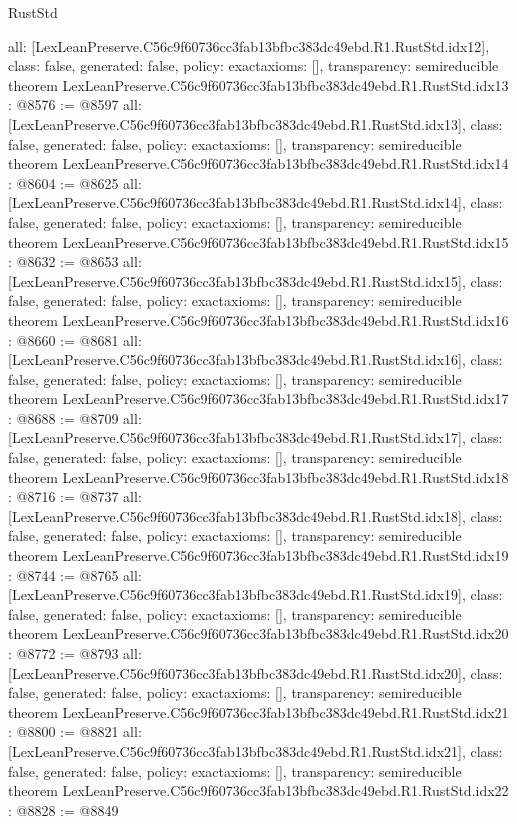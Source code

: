 \begin{lexlean}{RustStd}
\begin{coremodule}
{  all: [LexLeanPreserve.C56c9f60736cc3fab13bfbc383dc49ebd.R1.RustStd.idx12],
  class: false,
  generated: false,
  policy: exact{axioms: []},
  transparency: semireducible
}
theorem LexLeanPreserve.C56c9f60736cc3fab13bfbc383dc49ebd.R1.RustStd.idx13 : @8576 := @8597 {
  all: [LexLeanPreserve.C56c9f60736cc3fab13bfbc383dc49ebd.R1.RustStd.idx13],
  class: false,
  generated: false,
  policy: exact{axioms: []},
  transparency: semireducible
}
theorem LexLeanPreserve.C56c9f60736cc3fab13bfbc383dc49ebd.R1.RustStd.idx14 : @8604 := @8625 {
  all: [LexLeanPreserve.C56c9f60736cc3fab13bfbc383dc49ebd.R1.RustStd.idx14],
  class: false,
  generated: false,
  policy: exact{axioms: []},
  transparency: semireducible
}
theorem LexLeanPreserve.C56c9f60736cc3fab13bfbc383dc49ebd.R1.RustStd.idx15 : @8632 := @8653 {
  all: [LexLeanPreserve.C56c9f60736cc3fab13bfbc383dc49ebd.R1.RustStd.idx15],
  class: false,
  generated: false,
  policy: exact{axioms: []},
  transparency: semireducible
}
theorem LexLeanPreserve.C56c9f60736cc3fab13bfbc383dc49ebd.R1.RustStd.idx16 : @8660 := @8681 {
  all: [LexLeanPreserve.C56c9f60736cc3fab13bfbc383dc49ebd.R1.RustStd.idx16],
  class: false,
  generated: false,
  policy: exact{axioms: []},
  transparency: semireducible
}
theorem LexLeanPreserve.C56c9f60736cc3fab13bfbc383dc49ebd.R1.RustStd.idx17 : @8688 := @8709 {
  all: [LexLeanPreserve.C56c9f60736cc3fab13bfbc383dc49ebd.R1.RustStd.idx17],
  class: false,
  generated: false,
  policy: exact{axioms: []},
  transparency: semireducible
}
theorem LexLeanPreserve.C56c9f60736cc3fab13bfbc383dc49ebd.R1.RustStd.idx18 : @8716 := @8737 {
  all: [LexLeanPreserve.C56c9f60736cc3fab13bfbc383dc49ebd.R1.RustStd.idx18],
  class: false,
  generated: false,
  policy: exact{axioms: []},
  transparency: semireducible
}
theorem LexLeanPreserve.C56c9f60736cc3fab13bfbc383dc49ebd.R1.RustStd.idx19 : @8744 := @8765 {
  all: [LexLeanPreserve.C56c9f60736cc3fab13bfbc383dc49ebd.R1.RustStd.idx19],
  class: false,
  generated: false,
  policy: exact{axioms: []},
  transparency: semireducible
}
theorem LexLeanPreserve.C56c9f60736cc3fab13bfbc383dc49ebd.R1.RustStd.idx20 : @8772 := @8793 {
  all: [LexLeanPreserve.C56c9f60736cc3fab13bfbc383dc49ebd.R1.RustStd.idx20],
  class: false,
  generated: false,
  policy: exact{axioms: []},
  transparency: semireducible
}
theorem LexLeanPreserve.C56c9f60736cc3fab13bfbc383dc49ebd.R1.RustStd.idx21 : @8800 := @8821 {
  all: [LexLeanPreserve.C56c9f60736cc3fab13bfbc383dc49ebd.R1.RustStd.idx21],
  class: false,
  generated: false,
  policy: exact{axioms: []},
  transparency: semireducible
}
theorem LexLeanPreserve.C56c9f60736cc3fab13bfbc383dc49ebd.R1.RustStd.idx22 : @8828 := @8849 {
}
\end{coremodule}
\end{lexlean}

